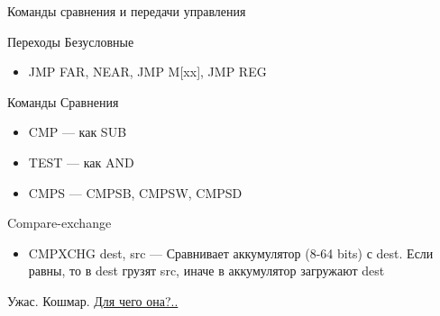 \documentclass[xetex,aspectratio=43]{beamer}
\begin{document}
\begin{frame}{Команды сравнения и передачи управления}
    \begin{block}{Переходы Безусловные}
        \begin{itemize}
            \tightlist
            \item
            JMP FAR, NEAR, JMP M{[}xx{]}, JMP REG
        \end{itemize}
    \end{block}

    \begin{block}{Команды Сравнения}
        \begin{itemize}
            \item
            CMP --- как SUB
            \item
            TEST --- как AND
            \item
            CMPS --- CMPSB, CMPSW, CMPSD
        \end{itemize}

        \pause

        Compare-exchange
        \begin{itemize}
            \tightlist
            \item
            CMPXCHG dest, src --- Сравнивает аккумулятор (8-64 bits) с dest. Если
            равны, то в dest грузят src, иначе в аккумулятор загружают dest
        \end{itemize}

        \pause

        Ужас. Кошмар.
        \href{https://ru.wikipedia.org/wiki/\%D0\%A1\%D1\%80\%D0\%B0\%D0\%B2\%D0\%BD\%D0\%B5\%D0\%BD\%D0\%B8\%D0\%B5_\%D1\%81_\%D0\%BE\%D0\%B1\%D0\%BC\%D0\%B5\%D0\%BD\%D0\%BE\%D0\%BC\#\%D0\%97\%D0\%B0\%D1\%87\%D0\%B5\%D0\%BC_\%D1\%8D\%D1\%82\%D0\%BE_\%D0\%BD\%D1\%83\%D0\%B6\%D0\%BD\%D0\%BE}{Для чего она?..}
    \end{block}
\end{frame}
\end{document}
